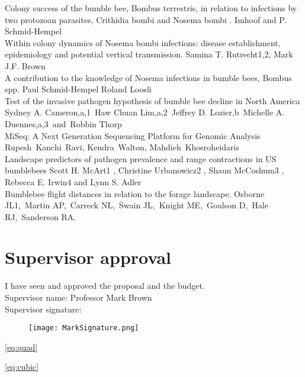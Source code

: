 \documentclass[11pt]{article}
\begin{document}
Colony success of the bumble bee, Bombus terrestris, in relation to infections by two protozoan parasites, Crithidia bombi and Nosema bombi . Imhoof and P. Schmid-Hempel \\

Within colony dynamics of Nosema bombi infections: disease establishment, epidemiology and potential vertical transmission. Samina T. Rutrecht1,2, Mark J.F. Brown \\

A contribution to the knowledge of Nosema infections in bumble bees, Bombus spp. Paul Schmid-Hempel Roland Loosli\\

Test of the invasive pathogen hypothesis of bumble bee decline in North America Sydney A. Cameron,a,1 Haw Chuan Lim,a,2 Jeffrey D. Lozier,b Michelle A. Duennes,a,3 and Robbin Thorp \\

MiSeq: A Next Generation Sequencing Platform for Genomic Analysis Rupesh Kanchi Ravi, Kendra Walton, Mahdieh Khosroheidaris \\

Landscape predictors of pathogen prevalence and range contractions in US bumblebees Scott H. McArt1 , Christine Urbanowicz2 , Shaun McCoshum3 , Rebecca E. Irwin4 and Lynn S. Adler \\

Bumblebee flight distances in relation to the forage landscape. Osborne JL1, Martin AP, Carreck NL, Swain JL, Knight ME, Goulson D, Hale RJ, Sanderson RA. \\

\newpage

	\section{Supervisor approval}

	
	I have seen and approved the proposal and the budget. \\
	
	
	Supervisor name: Professor Mark Brown \\
	
	 
	
	Supervisor signature: 

\begin{figure}[h!]
	
	\texttt{[image: MarkSignature.png]}
	
\end{figure} 

\ref{eq:quad}\

\ref{eq:cubic}\
\end{document}
